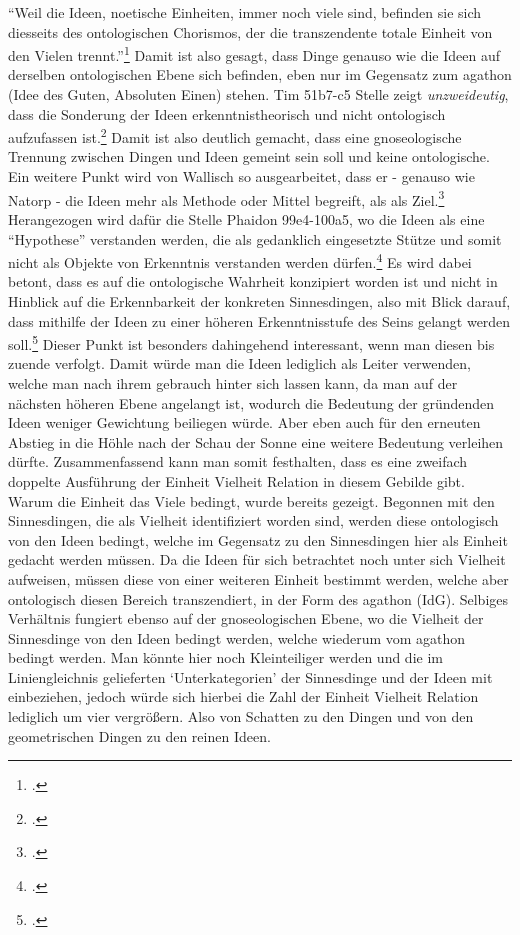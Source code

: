 \enquote{Weil die Ideen, noetische Einheiten, immer noch viele sind, befinden sie sich diesseits des ontologischen Chorismos, der die transzendente totale Einheit von den Vielen trennt.}\footcite[][S. 17]{Wallisch} Damit ist also gesagt, dass Dinge genauso wie die Ideen auf derselben ontologischen Ebene sich befinden, eben nur im Gegensatz zum agathon (Idee des Guten, Absoluten Einen) stehen.
Tim 51b7-c5 Stelle zeigt \emph{unzweideutig}, dass die Sonderung der Ideen erkenntnistheorisch und nicht ontologisch aufzufassen ist.\footcite[vgl.][S. 19]{Wallisch}
Damit ist also deutlich gemacht, dass eine gnoseologische Trennung zwischen Dingen und Ideen gemeint sein soll und keine ontologische.
Ein weitere Punkt wird von Wallisch so ausgearbeitet, dass er - genauso wie Natorp - die Ideen mehr als Methode oder Mittel begreift, als als Ziel.\footcite[vgl.][S. 26]{Wallisch} Herangezogen wird dafür die Stelle Phaidon 99e4-100a5, wo die Ideen als eine \enquote{Hypothese} verstanden werden, die als gedanklich eingesetzte Stütze und somit nicht als Objekte von Erkenntnis verstanden werden dürfen.\footcite[vgl.][S. 26]{Wallisch} Es wird dabei betont, dass es auf die ontologische Wahrheit konzipiert worden ist und nicht in Hinblick auf die Erkennbarkeit der konkreten Sinnesdingen, also mit Blick darauf, dass mithilfe der Ideen zu einer höheren Erkenntnisstufe des Seins gelangt werden soll.\footcite[vgl.][S. 28]{Wallisch}
Dieser Punkt ist besonders dahingehend interessant, wenn man diesen bis zuende verfolgt. Damit würde man die Ideen lediglich als Leiter verwenden, welche man nach ihrem gebrauch hinter sich lassen kann, da man auf der nächsten höheren Ebene angelangt ist, wodurch die Bedeutung der gründenden Ideen weniger Gewichtung beiliegen würde. Aber eben auch für den erneuten Abstieg in die Höhle nach der Schau der Sonne eine weitere Bedeutung verleihen dürfte. 
Zusammenfassend kann man somit festhalten, dass es eine zweifach doppelte Ausführung der Einheit Vielheit Relation in diesem Gebilde gibt. Warum die Einheit das Viele bedingt, wurde bereits gezeigt.
Begonnen mit den Sinnesdingen, die als Vielheit identifiziert worden sind, werden diese ontologisch von den Ideen bedingt, welche im Gegensatz zu den Sinnesdingen hier als Einheit gedacht werden müssen. Da die Ideen für sich betrachtet noch unter sich Vielheit aufweisen, müssen diese von einer weiteren Einheit bestimmt werden, welche aber ontologisch diesen Bereich transzendiert, in der Form des agathon (IdG). Selbiges Verhältnis fungiert ebenso auf der gnoseologischen Ebene, wo die Vielheit der Sinnesdinge von den Ideen bedingt werden, welche wiederum vom agathon bedingt werden. Man könnte hier noch Kleinteiliger werden und die im Liniengleichnis gelieferten \enquote*{Unterkategorien} der Sinnesdinge und der Ideen mit einbeziehen, jedoch würde sich hierbei die Zahl der Einheit Vielheit Relation lediglich um vier vergrößern. Also von Schatten zu den Dingen und von den geometrischen Dingen zu den reinen Ideen. 
